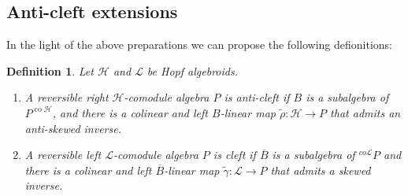 \documentclass[a4paper,reqno]{amsart}
\numberwithin{equation}{section}
\theoremstyle{plain}
\newtheorem{defi}[thm]{Definition}
\theoremstyle{remark}
\numberwithin{equation}{section}
\newcommand\ol{\overline}
\newcommand{\cL}{\mathcal{L}}
\newcommand{\CH}{\mathcal{H}}
\newcommand{\CL}{\mathcal{L}}
\newcommand\co{{\operatorname{co}}}
\begin{document}
\subsection{Anti-cleft extensions}
In the light of the above preparations we can propose the following defionitions:
\begin{defi}\label{Anti-cleft extensions}
    Let $\CH$ and $\cL$ be  Hopf algebroids. 
    \begin{enumerate}
        \item A  reversible right $\CH$-comodule algebra $P$ is anti-cleft if $B$ is a subalgebra of $P^{\co\CH}$, and there is a colinear and left $B$-linear map  $\tilde\rho\colon\CH\to P$ that admits  an anti-skewed inverse.
        \item A  reversible left $\CL$-comodule algebra $P$ is cleft if $\ol B$ is a subalgebra of ${}^{co\CL}P$ and there is a colinear and left $\ol B$-linear map $\tilde\gamma\colon\CL\to P$ that admits a skewed inverse.
    \end{enumerate}
\end{defi}
\end{document}
